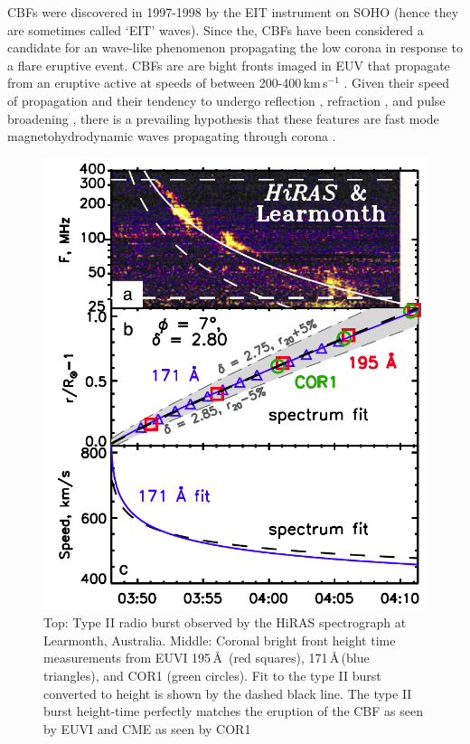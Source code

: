 CBFs were discovered in 1997-1998 \citep{moses1997, thompson1998} by the EIT instrument on SOHO (hence they are sometimes called \textquoteleft EIT' waves). Since the, CBFs have been considered a candidate for an wave-like phenomenon propagating the low corona in response to a flare eruptive event. CBFs are are bight fronts imaged in EUV that propagate from an eruptive active at speeds of between 200-400\,km\,s$^{-1}$ \citep{thompson2009}. Given their speed of propagation and their tendency to undergo reflection \citep{gopal2009}, refraction \citep{wang2000}, and pulse broadening \citep{long2011}, there is a prevailing hypothesis that these features are fast mode magnetohydrodynamic waves propagating through corona \citep{veronig2010}.
\begin{figure}[!t]
\begin{center}
\includegraphics[trim=3cm 0cm 0cm 2cm, scale=0.3]{images/grechnev2011}
\caption[Comparison of EUV wave and type II height-time]{Top: Type II radio burst observed by the HiRAS spectrograph at Learmonth, Australia. Middle: Coronal bright front height time measurements from EUVI 195\,\AA\, (red squares), 171\,\AA\,(blue triangles), and COR1 (green circles). Fit to the type II burst converted to height is shown by the dashed black line. The type II burst height-time perfectly matches the eruption of the CBF as seen by EUVI and CME as seen by COR1 \citep{grechnev2011a}}
\label{fig:typeII_cbf}
\end{center}
\end{figure}
